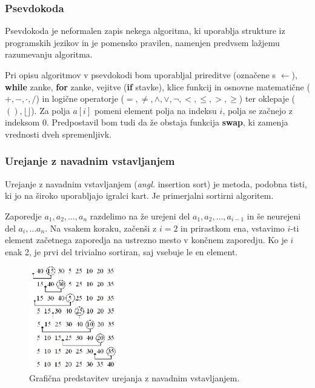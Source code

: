\documentclass[a4paper,oneside,12pt]{article}
\begin{document}
\subsubsection{Psevdokoda}
Psevdokoda je neformalen zapis nekega algoritma, ki uporablja strukture iz programskih
jezikov in je pomensko pravilen, namenjen predvsem lažjemu razumevanju algoritma.

Pri opisu algoritmov v psevdokodi bom uporabljal prireditve (označene s $\gets$), 
\textbf{while} zanke, \textbf{for} zanke, vejitve (\textbf{if} stavke), klice 
funkcij in osnovne  matematične ($+, -, \cdot, /$) in logične operatorje ($=, 
\neq, \wedge, \vee, \neg, <, \leq, >, \geq$) ter oklepaje ($(), \lfloor\rfloor$). 
Za polja $a[i]$ pomeni element polja na indeksu $i$, polja se začnejo z indeksom $0$.
Predpostavil bom tudi da že obstaja funkcija \textbf{swap}, ki zamenja vrednosti dveh
spremenljivk.

\subsubsection{Urejanje z navadnim vstavljanjem}
\label{chapter:insertionsort}
Urejanje z navadnim vstavljanjem (\emph{angl.} insertion sort) je metoda,
podobna tisti, ki jo na široko uporabljajo igralci kart. Je primerjalni sortirni algoritem.

Zaporedje $a_1, a_2, \ldots, a_n$ razdelimo na že urejeni del $a_1, a_2, \ldots, a_{i-1}$
in še neurejeni del $a_i, \ldots a_n$. Na vsakem koraku, začenši z $i = 2$ in
prirastkom ena, vstavimo $i$-ti element začetnega zaporedja na ustrezno mesto v končnem
zaporedju. Ko je $i$ enak 2, je prvi del trivialno sortiran, saj vsebuje le en element.

\begin{figure}[h]
    \begin{center}
        \includegraphics[height=45mm]{slike/insertionsort.png}
    \end{center}
    \vspace{-0.7cm}
    \caption[Urejanje z vstavljanjem]{Grafična predstavitev urejanja z navadnim vstavljanjem.}
    \label{fig:insertionsortimage}
\end{figure}
\end{document}
